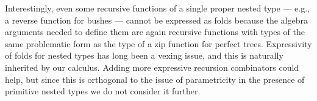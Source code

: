 \documentclass[runningheads]{llncs}
\begin{document}
Interestingly, even some recursive functions of a single proper nested
type --- e.g., a reverse function for bushes --- cannot be expressed
as folds because the algebra arguments needed to define them are again
recursive functions with types of the same problematic form as the
type of a zip function for perfect trees.  Expressivity of folds for
nested types has long been a vexing issue, and this is naturally
inherited by our calculus.  Adding more expressive recursion
combinators could help, but since this is orthogonal to the issue of
parametricity in the presence of primitive nested types we do not
consider it further.

\end{document}
